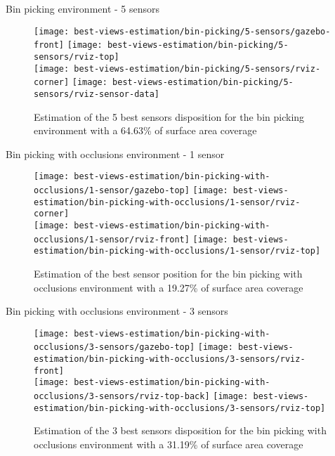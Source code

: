 Bin picking environment - 5 sensors

\begin{figure}
	\centering
	\texttt{[image: best-views-estimation/bin-picking/5-sensors/gazebo-front]}\hspace{2em}
	\texttt{[image: best-views-estimation/bin-picking/5-sensors/rviz-top]}\\
	\texttt{[image: best-views-estimation/bin-picking/5-sensors/rviz-corner]}\hspace{2em}
	\texttt{[image: best-views-estimation/bin-picking/5-sensors/rviz-sensor-data]}
	\caption{Estimation of the 5 best sensors disposition for the bin picking environment with a 64.63\% of surface area coverage}
\end{figure}


Bin picking with occlusions environment - 1 sensor

\begin{figure}
	\centering
	\texttt{[image: best-views-estimation/bin-picking-with-occlusions/1-sensor/gazebo-top]}\hspace{2em}
	\texttt{[image: best-views-estimation/bin-picking-with-occlusions/1-sensor/rviz-corner]}\\
	\texttt{[image: best-views-estimation/bin-picking-with-occlusions/1-sensor/rviz-front]}\hspace{2em}
	\texttt{[image: best-views-estimation/bin-picking-with-occlusions/1-sensor/rviz-top]}
	\caption{Estimation of the best sensor position for the bin picking with occlusions environment with a 19.27\% of surface area coverage}
\end{figure}


Bin picking with occlusions environment - 3 sensors

\begin{figure}
	\centering
	\texttt{[image: best-views-estimation/bin-picking-with-occlusions/3-sensors/gazebo-top]}\hspace{2em}
	\texttt{[image: best-views-estimation/bin-picking-with-occlusions/3-sensors/rviz-front]}\\
	\texttt{[image: best-views-estimation/bin-picking-with-occlusions/3-sensors/rviz-top-back]}\hspace{2em}
	\texttt{[image: best-views-estimation/bin-picking-with-occlusions/3-sensors/rviz-top]}
	\caption{Estimation of the 3 best sensors disposition for the bin picking with occlusions environment with a 31.19\% of surface area coverage}
\end{figure}


